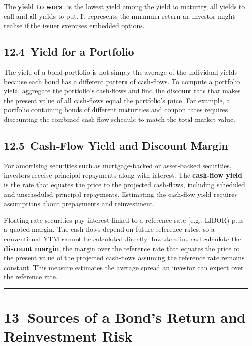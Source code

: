 \documentclass[
  letterpaper,
  DIV=11,
  numbers=noendperiod]{scrartcl}
\begin{document}
The \textbf{yield to worst} is the lowest yield among the yield to
maturity, all yields to call and all yields to put. It represents the
minimum return an investor might realise if the issuer exercises
embedded options.

\subsection{12.4~Yield for a Portfolio}\label{yield-for-a-portfolio}

The yield of a bond portfolio is not simply the average of the
individual yields because each bond has a different pattern of
cash‑flows. To compute a portfolio yield, aggregate the portfolio's
cash‑flows and find the discount rate that makes the present value of
all cash‑flows equal the portfolio's price. For example, a portfolio
containing bonds of different maturities and coupon rates requires
discounting the combined cash‑flow schedule to match the total market
value.

\subsection{12.5~Cash‑Flow Yield and Discount
Margin}\label{cashflow-yield-and-discount-margin}

For amortising securities such as mortgage‑backed or asset‑backed
securities, investors receive principal repayments along with interest.
The \textbf{cash‑flow yield} is the rate that equates the price to the
projected cash‑flows, including scheduled and unscheduled principal
repayments. Estimating the cash‑flow yield requires assumptions about
prepayments and reinvestment.

Floating‑rate securities pay interest linked to a reference rate (e.g.,
LIBOR) plus a quoted margin. The cash‑flows depend on future reference
rates, so a conventional YTM cannot be calculated directly. Investors
instead calculate the \textbf{discount margin}, the margin over the
reference rate that equates the price to the present value of the
projected cash‑flows assuming the reference rate remains constant. This
measure estimates the average spread an investor can expect over the
reference rate.

\begin{center}\rule{0.5\linewidth}{0.5pt}\end{center}

\section{13~Sources of a Bond's Return and Reinvestment
Risk}\label{sources-of-a-bonds-return-and-reinvestment-risk}
\end{document}
